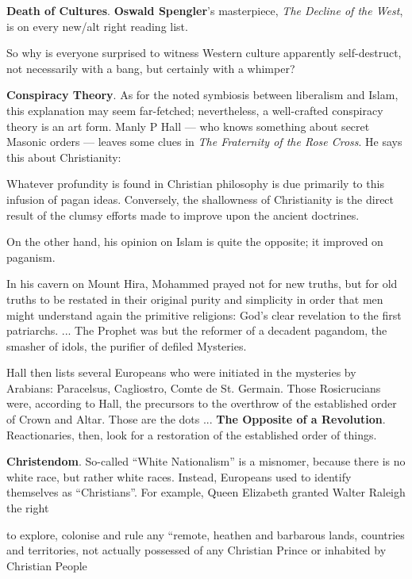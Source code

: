 \textbf{Death of Cultures}. \textbf{Oswald Spengler}'s masterpiece, \emph{The Decline of the West}, is on every new/alt right reading list.

So why is everyone surprised to witness Western culture apparently self-destruct, not necessarily with a bang, but certainly with a whimper?

\textbf{Conspiracy Theory}. As for the noted symbiosis between liberalism and Islam, this explanation may seem far-fetched; nevertheless, a well-crafted conspiracy theory is an art form. Manly P Hall --- who knows something about secret Masonic orders --- leaves some clues in \emph{The Fraternity of the Rose Cross}. He says this about Christianity:

\begin{quotex}
Whatever profundity is found in Christian philosophy is due primarily to this infusion of pagan ideas. Conversely, the shallowness of Christianity is the direct result of the clumsy efforts made to improve upon the ancient doctrines.
\end{quotex}


On the other hand, his opinion on Islam is quite the opposite; it improved on paganism.

\begin{quotex}
In his cavern on Mount Hira, Mohammed prayed not for new truths, but for old truths to be restated in their original purity and simplicity in order that men might understand again the primitive religions: God's clear revelation to the first patriarchs. ... The Prophet was but the reformer of a decadent pagandom, the smasher of idols, the purifier of defiled Mysteries.
\end{quotex}


Hall then lists several Europeans who were initiated in the mysteries by Arabians: Paracelsus, Cagliostro, Comte de St. Germain. Those Rosicrucians were, according to Hall, the precursors to the overthrow of the established order of Crown and Altar. Those are the dots ... \textbf{The Opposite of a Revolution}. Reactionaries, then, look for a restoration of the established order of things.

\textbf{Christendom}. So-called ``White Nationalism'' is a misnomer, because there is no white race, but rather white races. Instead, Europeans used to identify themselves as ``Christians''. For example, Queen Elizabeth granted Walter Raleigh the right

\begin{quotex}
to explore, colonise and rule any ``remote, heathen and barbarous lands, countries and territories, not actually possessed of any Christian Prince or inhabited by Christian People
\end{quotex}


